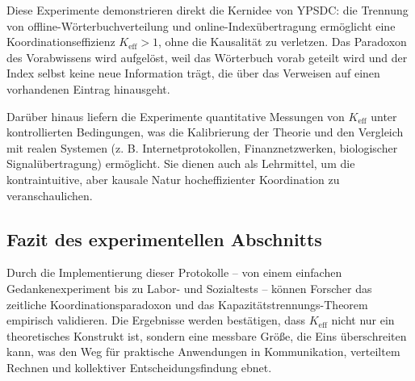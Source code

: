 \documentclass[12pt]{article}
\begin{document}
	Diese Experimente demonstrieren direkt die Kernidee von YPSDC: die Trennung von offline-Wörterbuchverteilung und online-Indexübertragung ermöglicht eine Koordinationseffizienz \(K_{\mathrm{eff}} > 1\), ohne die Kausalität zu verletzen. Das Paradoxon des Vorabwissens wird aufgelöst, weil das Wörterbuch vorab geteilt wird und der Index selbst keine neue Information trägt, die über das Verweisen auf einen vorhandenen Eintrag hinausgeht.
	
	Darüber hinaus liefern die Experimente quantitative Messungen von \(K_{\mathrm{eff}}\) unter kontrollierten Bedingungen, was die Kalibrierung der Theorie und den Vergleich mit realen Systemen (z. B. Internetprotokollen, Finanznetzwerken, biologischer Signalübertragung) ermöglicht. Sie dienen auch als Lehrmittel, um die kontraintuitive, aber kausale Natur hocheffizienter Koordination zu veranschaulichen.
	
	\subsection{Fazit des experimentellen Abschnitts}
	
	Durch die Implementierung dieser Protokolle – von einem einfachen Gedankenexperiment bis zu Labor- und Sozialtests – können Forscher das zeitliche Koordinationsparadoxon und das Kapazitätstrennungs-Theorem empirisch validieren. Die Ergebnisse werden bestätigen, dass \(K_{\mathrm{eff}}\) nicht nur ein theoretisches Konstrukt ist, sondern eine messbare Größe, die Eins überschreiten kann, was den Weg für praktische Anwendungen in Kommunikation, verteiltem Rechnen und kollektiver Entscheidungsfindung ebnet.
	
\end{document}

